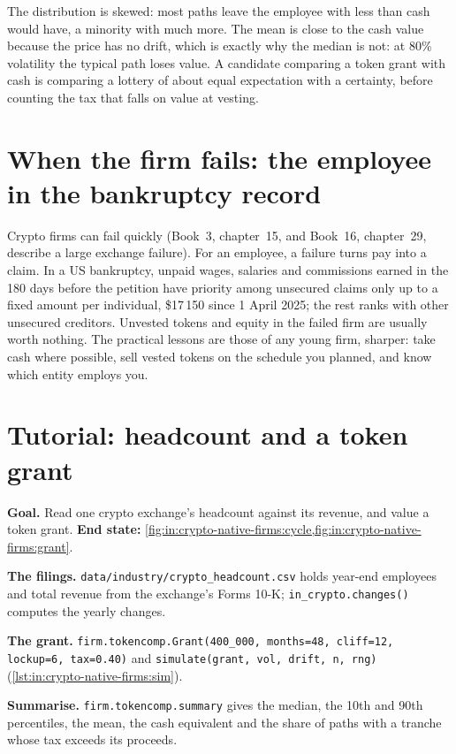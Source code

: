 The distribution is skewed: most paths leave the employee with less than cash would have, a minority with much more.
The mean is close to the cash value because the price has no drift, which is exactly why the median is not: at 80\%
volatility the typical path loses value. A candidate comparing a token grant with cash is comparing a lottery of about
equal expectation with a certainty, before counting the tax that falls on value at vesting.

\section{When the firm fails: the employee in the bankruptcy record}

Crypto firms can fail quickly (Book~3, chapter~15, and Book~16, chapter~29, describe a large exchange failure). For an
employee, a failure turns pay into a claim. In a US bankruptcy,
unpaid wages, salaries and commissions earned in the 180 days before the petition have priority among unsecured claims
only up to a fixed amount per individual, \$17\,150 since 1 April 2025; the rest ranks with other unsecured creditors.
Unvested tokens and equity in the failed firm are usually worth nothing. The practical lessons are those of any young
firm, sharper: take cash where possible, sell vested tokens on the schedule you planned, and know which entity employs
you.

\section{Tutorial: headcount and a token grant}\label{tut:in:crypto-native-firms:tut}

\begin{tutorial}
\textbf{Goal.} Read one crypto exchange's headcount against its revenue, and value a token grant.
\textbf{End state:} \cref{fig:in:crypto-native-firms:cycle,fig:in:crypto-native-firms:grant}.
\begin{tutsteps}
\item \textbf{The filings.} \texttt{data/industry/crypto\_headcount.csv} holds year-end employees and total revenue from
the exchange's Forms 10-K; \texttt{in\_crypto.changes()} computes the yearly changes.
\item \textbf{The grant.} \texttt{firm.tokencomp.Grant(400\_000, months=48, cliff=12, lockup=6, tax=0.40)} and
\texttt{simulate(grant, vol, drift, n, rng)} (\cref{lst:in:crypto-native-firms:sim}).
\label{lst:in:crypto-native-firms:sim}
\item \textbf{Summarise.} \texttt{firm.tokencomp.summary} gives the median, the 10th and 90th percentiles, the mean,
the cash equivalent and the share of paths with a tranche whose tax exceeds its proceeds.
\end{tutsteps}
\end{tutorial}

